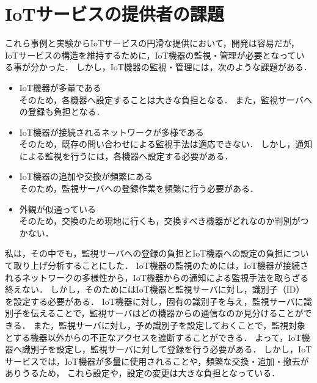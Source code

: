 \section{IoTサービスの提供者の課題}
これら事例と実験からIoTサービスの円滑な提供において，開発は容易だが，IoTサービスの構造を維持するために，IoT機器の監視・管理が必要となっている事が分かった．
しかし，IoT機器の監視・管理には，次のような課題がある．
\begin{itemize}
\item IoT機器が多量である\\
	そのため，各機器へ設定することは大きな負担となる．
	また，監視サーバへの登録も負担となる．
\item IoT機器が接続されるネットワークが多様である\\
	そのため，既存の問い合わせによる監視手法は適応できない．
	しかし，通知による監視を行うには，各機器へ設定する必要がある．
\item IoT機器の追加や交換が頻繁にある\\
	そのため，監視サーバへの登録作業を頻繁に行う必要がある．
\item 外観が似通っている\\
	そのため，交換のため現地に行くも，交換すべき機器がどれなのか判別がつかない．
\end{itemize}


私は，その中でも，監視サーバへの登録の負担とIoT機器への設定の負担について取り上げ分析することにした．
IoT機器の監視のためには，IoT機器が接続されるネットワークの多様性から，IoT機器からの通知による監視手法を取らざる終えない．
しかし，そのためにはIoT機器と監視サーバに対し，識別子（ID）を設定する必要がある．
IoT機器に対し，固有の識別子を与え，監視サーバに識別子を伝えることで，監視サーバはどの機器からの通信なのか見分けることができる．
また，監視サーバに対し，予め識別子を設定しておくことで，監視対象とする機器以外からの不正なアクセスを遮断することができる．
よって，IoT機器へ識別子を設定し，監視サーバに対して登録を行う必要がある．
しかし，IoTサービスでは，IoT機器が多量に使用されることや，頻繁な交換・追加・撤去がありうるため，
これら設定や，設定の変更は大きな負担となっている．


